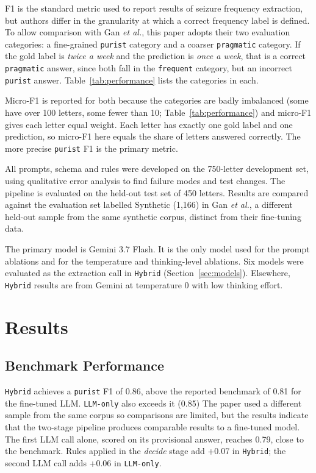 \documentclass[conference]{IEEEtran}
\begin{document}
F1 is the standard metric used to report results of seizure 
frequency extraction, but authors differ in the granularity at 
which a correct frequency label is defined. To allow 
comparison with Gan \emph{et al.}\cite{b3}, this paper adopts 
their two evaluation categories: a fine-grained \texttt{purist} 
category and a coarser \texttt{pragmatic} category. If the gold 
label is \emph{twice a week} and the prediction is \emph{once 
a week}, that is a correct \texttt{pragmatic} answer, since 
both fall in the \texttt{frequent} category, but an incorrect 
\texttt{purist} answer. Table~\ref{tab:performance} lists the 
categories in each.

Micro-F1 is reported for both because the 
categories are badly imbalanced (some have over 100 letters, 
some fewer than 10; Table~\ref{tab:performance}) and micro-F1 
gives each letter equal weight. Each letter has exactly one 
gold label and one prediction, so micro-F1 here equals the 
share of letters answered correctly. The more precise 
\texttt{purist} F1 is the primary metric.

All prompts, schema and rules were developed on the 
750-letter development set, using qualitative error analysis to 
find failure modes and test changes. The pipeline is 
evaluated on the held-out test set of 450 letters. Results are compared 
against the evaluation set labelled Synthetic (1,166) in Gan 
\emph{et al.}\cite{b3}, a different held-out sample from the 
same synthetic corpus, distinct from their fine-tuning data.

The primary model is Gemini 3.7 Flash. It is the only model 
used for the 
prompt ablations and for the temperature and thinking-level 
ablations. Six models were evaluated as the extraction call in 
\texttt{Hybrid} (Section~\ref{sec:models}). Elsewhere, 
\texttt{Hybrid} results are from Gemini at temperature 0 with 
low thinking effort. 

\section{Results}

\subsection{Benchmark Performance}
\label{sec:benchmark}

\texttt{Hybrid} achieves a \texttt{purist} F1 of 0.86, 
above the reported benchmark of 0.81 for the 
fine-tuned LLM\cite{b3}. \texttt{LLM-only} also exceeds it (0.85) 
The paper used a different sample from the same corpus 
so comparisons are limited, but the results indicate that 
the two-stage pipeline produces comparable results to
a fine-tuned model. The first LLM call alone, scored on its 
provisional answer, reaches 0.79, close to the benchmark. 
Rules applied in the \emph{decide} stage add +0.07 in \texttt{Hybrid}; 
the second LLM call adds +0.06 in \texttt{LLM-only}. 
\end{document}

